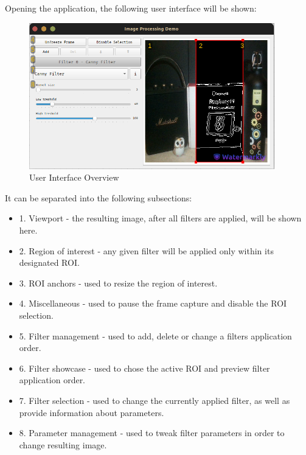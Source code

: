 Opening the application, the following user interface will be shown:
\begin{figure}[H]
	\includegraphics[width=0.95\textwidth, height=0.5\textwidth]{resources/Manual_Outline.jpg}
	\caption{User Interface Overview}
\end{figure}

It can be separated into the following subsections:
\begin{itemize}
	\item 1. Viewport - the resulting image, after all filters are applied, will be shown here.
	\item 2. Region of interest - any given filter will be applied only within its designated ROI.
	\item 3. ROI anchors - used to resize the region of interest.
	\item 4. Miscellaneous - used to pause the frame capture and disable the ROI selection.
	\item 5. Filter management - used to add, delete or change a filters application order.
	\item 6. Filter showcase - used to chose the active ROI and preview filter application order.
	\item 7. Filter selection - used to change the currently applied filter, as well as provide
	      information about parameters.
	\item 8. Parameter management - used to tweak filter parameters in order to change resulting image.
\end{itemize}







